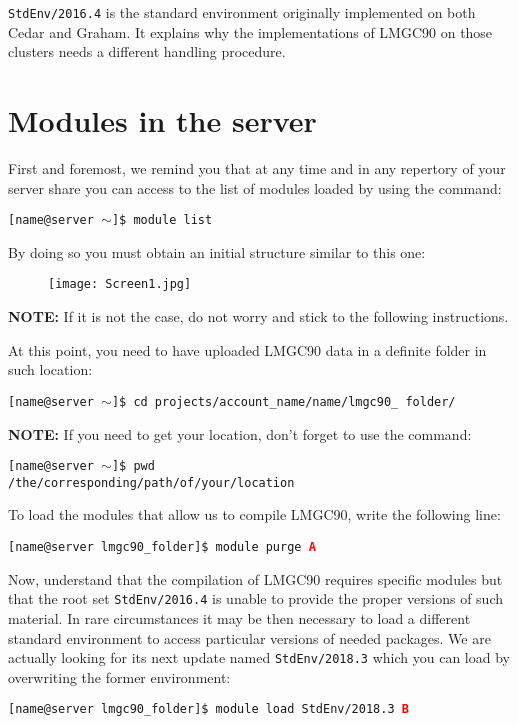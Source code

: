 \documentclass[12pt]{article}
\begin{document}
\texttt{StdEnv/2016.4} is the standard environment originally implemented on both Cedar and Graham. It explains why the implementations of LMGC90 on those clusters needs a different handling procedure.  

\section*{Modules in the server}
First and foremost, we remind you that at any time and in any repertory of your server share you can access to the list of modules loaded by using the command:

\begin{tcolorbox}
\texttt{[name@server $\sim$]\$ module list}
\end{tcolorbox}

By doing so you must obtain an initial structure similar to this one:
\begin{figure}[H]
  \centering
  \texttt{[image: Screen1.jpg]}
\end{figure}
\textbf{NOTE:} If it is not the case, do not worry and stick to the following instructions.

At this point, you need to have uploaded LMGC90 data in a definite folder in such location:
\begin{tcolorbox}
\texttt{[name@server $\sim$]\$ cd projects/account\_name/name/lmgc90\_ folder/}
\end{tcolorbox}
\textbf{NOTE:} If you need to get your location, don’t forget to use the command:
\begin{tcolorbox}
\texttt{[name@server $\sim$]\$ pwd}\\
\texttt{/the/corresponding/path/of/your/location}
\end{tcolorbox}
\vspace{1cm}
To load the modules that allow us to compile LMGC90, write the following line:
\begin{tcolorbox}
\texttt{[name@server lmgc90\_folder]\$ module purge \textcolor{red}{\textbf{A}}} 
\end{tcolorbox}
Now, understand that the compilation of LMGC90 requires specific modules but that the root set \texttt{StdEnv/2016.4} is unable to provide the proper versions of such material. In rare circumstances it may be then necessary to load a different standard environment to access particular versions of needed packages. We are actually looking for its next update named \texttt{StdEnv/2018.3} which you can load by overwriting the former environment:
\begin{tcolorbox}
\texttt{[name@server lmgc90\_folder]\$ module load StdEnv/2018.3 \textcolor{red}{\textbf{B}}} 
\end{tcolorbox}
\end{document}

